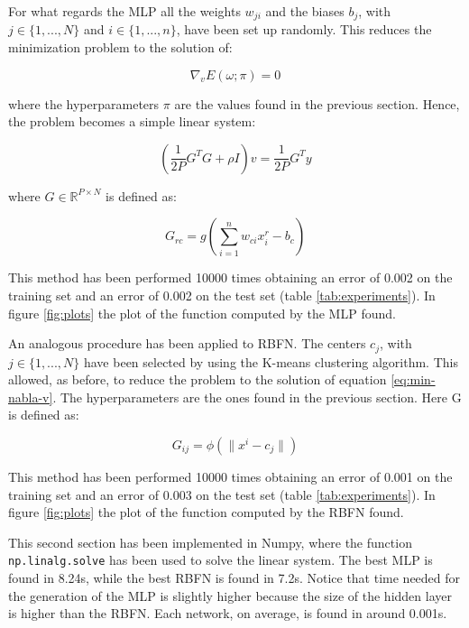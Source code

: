 \documentclass[a4paper]{article}
\numberwithin{equation}{section} %
\numberwithin{figure}{section} %
\numberwithin{table}{section} %
\theoremstyle{definition}
\begin{document}
For what regards the MLP all the weights $w_{ji}$ and the biases $b_j$, with
$j \in \{ 1, ..., N \} $ and $i \in \{ 1, ..., n \} $, have been set up
randomly. This reduces the minimization problem to the solution of:

\begin{equation}
 	\label{eq:min-nabla-v}
	\nabla_v E(\omega; \pi) = 0
\end{equation}

\noindent where the hyperparameters $\pi$ are the values found in the previous
section. Hence, the problem becomes a simple linear system:

\[ \left( \frac{1}{2P} G^T G + \rho I \right) v = \frac{1}{2P} G^T y \]

\noindent where $G \in \mathbb{R}^{P \times N}$ is defined as:

\[ G_{rc} = g\left( \sum_{i=1}^{n} w_{ci}x_i^r - b_c \right) \]

This method has been performed 10000 times obtaining an error of 0.002 on the
training set and an error of 0.002 on the test set (table \ref{tab:experiments}). In figure
\ref{fig:plots} the plot of the function computed by the MLP found.

An analogous procedure has been applied to RBFN.
The centers $c_j$, with $ j \in \{ 1,  ..., N \} $ have been selected by
using the K-means clustering algorithm. This allowed, as before, to reduce the
problem to the solution of equation \ref{eq:min-nabla-v}. The hyperparameters
are the ones found in the previous section. Here G is defined as:

\[ G_{ij} = \phi\left( \| x^i - c_j \| \right) \]

This method has been performed 10000 times obtaining an error of 0.001 on the
training set and an error of 0.003 on the test set (table \ref{tab:experiments}). In figure
\ref{fig:plots} the plot of the function computed by the RBFN found.

This second section has been implemented in Numpy, where the function
\texttt{np.linalg.solve} has been used to solve the linear system. The best MLP
is found in 8.24s, while the best RBFN is found in 7.2s. Notice that time
needed for the  generation of the MLP is slightly higher because the size of
the hidden layer is higher than the RBFN. Each network, on average,
is found in around 0.001s.

\end{document}
